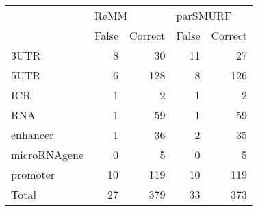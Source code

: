 \begin{tabular}{lrrrr}
\toprule
{} & \multicolumn{2}{l}{ReMM} & \multicolumn{2}{l}{parSMURF} \\
{} & False & Correct &    False & Correct \\
\midrule
3UTR         &     8 &      30 &       11 &      27 \\
5UTR         &     6 &     128 &        8 &     126 \\
ICR          &     1 &       2 &        1 &       2 \\
RNA          &     1 &      59 &        1 &      59 \\
enhancer     &     1 &      36 &        2 &      35 \\
microRNAgene &     0 &       5 &        0 &       5 \\
promoter     &    10 &     119 &       10 &     119 \\
Total        &    27 &     379 &       33 &     373 \\
\bottomrule
\end{tabular}
